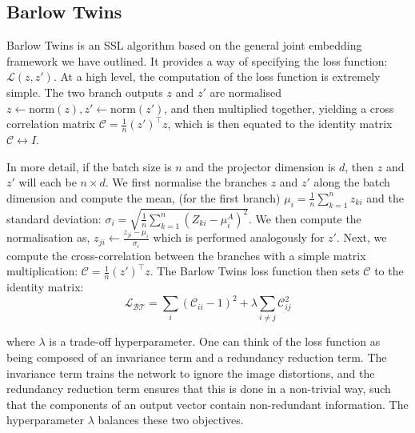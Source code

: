 \documentclass[a4paper,fleqn]{cas-dc}
\begin{document}
\subsection{Barlow Twins}
\label{sec:ssl}

Barlow Twins is an SSL algorithm based on the general joint embedding framework we have outlined. It provides a way of specifying the loss function: $\mathcal{L}(z,z')$. At a high level, the computation of the loss function is extremely simple. The two branch outputs $z$ and $z'$ are normalised $z \leftarrow \text{norm}(z), z' \leftarrow \text{norm}(z')$,  and then multiplied together, yielding a cross correlation matrix $\mathcal{C}=\frac{1}{n}(z')^{\top} z$, which is then equated to the identity matrix  $\mathcal{C}\leftrightarrow I$.

In more detail, if the batch size is $n$ and the projector dimension is $d$, then $z$ and $z'$ will each be $n \times d$.  We first normalise the branches $z$ and $z'$   along the batch dimension and compute the mean, (for the first branch)   $\mu_i = \frac{1}{n} \sum_{k=1}^{n} z_{ki}$ and  the standard deviation: $\sigma_i = \sqrt{\frac{1}{n} \sum_{k=1}^{n} \left(Z_{ki} - \mu_i^A\right)^2}$. We then compute the normalisation as, $z_{ji} \leftarrow \frac{z_{ji}-\mu_i}{\sigma_i}$ which is performed analogously for $z'$. Next, we compute the cross-correlation between the branches with a simple matrix multiplication: $\mathcal{C} = \frac{1}{n}(z')^{\top} z.$ The Barlow Twins loss function then sets $\mathcal{C}$ to the identity matrix: 
\begin{equation}
\mathcal{L_{BT}} = \sum_{i} (\mathcal{C}_{ii}-1)^2 + \lambda  \sum_{i\neq j} \mathcal{C}_{ij}^2
\label{eq:bt}
\end{equation}

where $\lambda$ is a trade-off hyperparameter. One can think of the loss function as being composed of an invariance term and a redundancy reduction term. The invariance term trains the network to ignore the image distortions, and the redundancy reduction term ensures that this is done in a non-trivial way, such that the components of an output vector contain non-redundant information. The hyperparameter  $\lambda$ balances these two objectives.
\end{document}
